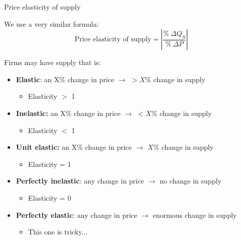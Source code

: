 \documentclass[compress]{beamer}
\begin{document}
\begin{frame}{Price elasticity of supply}


\begin{block}{We use a very similar formula:}
\[    \text{Price elasticity of supply} = |\dfrac{\%~\Delta Q_S}{\%~\Delta P}|
\]
\end{block}

\begin{block}{Firms may have supply that is:}
    \begin{itemize}
        \item \textbf{Elastic}: an X\% change in price $\to$ $>X\%$ change in supply
        \begin{itemize}
            \item Elasticity $>$ 1
        \end{itemize}
        \item \textbf{Inelastic: }an X\% change in price $\to$ $<X\%$ change in supply
        \begin{itemize}
            \item Elasticity $<$ 1
        \end{itemize}
        \item \textbf{Unit elastic:} an X\% change in price $\to$ $X\%$ change in supply
        \begin{itemize}
            \item Elasticity = 1
        \end{itemize}
        \item \textbf{Perfectly inelastic}: any change in price $\to$ no change in supply 
        \begin{itemize}
            \item Elasticity = 0
        \end{itemize}
                \item \textbf{Perfectly elastic}: any change in price $\to$ enormous change in supply
        \begin{itemize}
            \item This one is tricky...
        \end{itemize}
    \end{itemize}
\end{block}
    
\end{frame}
\end{document}
